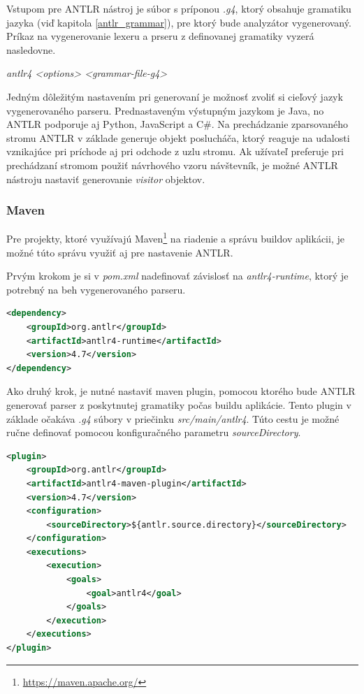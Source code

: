 Vstupom pre ANTLR nástroj je súbor s príponou \textit{.g4}, ktorý obsahuje gramatiku jazyka (viď kapitola \ref{antlr_grammar}), pre ktorý bude analyzátor vygenerovaný. Príkaz na vygenerovanie lexeru a prseru z definovanej gramatiky vyzerá nasledovne.
\begin{center}
\textit{antlr4 <options> <grammar-file-g4>}
\end{center}

Jedným dôležitým nastavením pri generovaní je možnosť zvoliť si cieľový jazyk vygenerovaného parseru. Prednastaveným výstupným jazykom je Java, no ANTLR podporuje aj Python, JavaScript a C\#. Na prechádzanie zparsovaného stromu ANTLR v základe generuje objekt poslucháča, ktorý reaguje na udalosti vznikajúce pri príchode aj pri odchode z uzlu stromu. Ak užívateľ preferuje pri prechádzaní stromom použiť návrhového vzoru návštevník, je možné ANTLR nástroju nastaviť generovanie \textit{visitor} objektov.

\subsubsection{Maven}
Pre projekty, ktoré využívajú Maven\footnote{\url{https://maven.apache.org/}} na riadenie a správu buildov aplikácii, je možné túto správu využiť aj pre nastavenie ANTLR.

Prvým krokom je si v \textit{pom.xml} nadefinovať závislosť na \textit{antlr4-runtime}, ktorý je potrebný na beh vygenerovaného parseru.

\begin{lstlisting}[language=XML, frame=none, numbers=none]
<dependency>
    <groupId>org.antlr</groupId>
    <artifactId>antlr4-runtime</artifactId>
    <version>4.7</version>
</dependency>
\end{lstlisting}

Ako druhý krok, je nutné nastaviť maven plugin, pomocou ktorého bude ANTLR generovať parser z poskytnutej gramatiky počas buildu aplikácie. Tento plugin v základe očakáva \textit{.g4} súbory v priečinku \textit{src/main/antlr4}. Túto cestu je možné ručne definovať pomocou konfiguračného parametru \textit{sourceDirectory}.

\begin{minipage}{\linewidth}
\begin{lstlisting}[language=XML, frame=none, numbers=none]
<plugin>
    <groupId>org.antlr</groupId>
    <artifactId>antlr4-maven-plugin</artifactId>
    <version>4.7</version>
    <configuration>
        <sourceDirectory>${antlr.source.directory}</sourceDirectory>
    </configuration>
    <executions>
        <execution>
            <goals>
                <goal>antlr4</goal>
            </goals>
        </execution>
    </executions>
</plugin>
\end{lstlisting}
\end{minipage}


